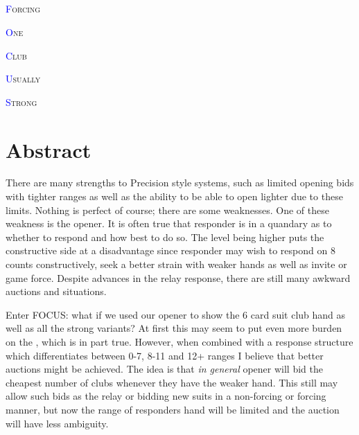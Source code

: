 \documentclass[letterpaper,11pt,oneside]{memoir}
\begin{document}
\frontmatter
\section*{}
\thispagestyle{empty}
\HUGE
\renewcommand{\LettrineFontHook}{\fontspec{BAUHS93.ttf}}

\lettrine[lraise=0.35,ante=\hspace*{2.2in}]{\textcolor{blue}{F}}{orcing}
	
\lettrine[lraise=0.35,ante=\hspace*{2.5in}]{\textcolor{blue}{O}}{ne}
	
\lettrine[lraise=0.35,ante=\hspace*{3in}]{\textcolor{blue}{C}}{lub}
	
\lettrine[lraise=0.35,ante=\hspace*{3.5in}]{\textcolor{blue}{U}}{sually}

\lettrine[lraise=0.35,ante=\hspace*{4in}]{\textcolor{blue}{S}}{trong}

\normalsize


\mainmatter
\chapter{Abstract}
There are many strengths to Precision style systems, such as limited opening bids with tighter ranges as well as the ability to be able to open lighter due to these limits. Nothing is perfect of course; there are some weaknesses. One of these weakness is the  opener.  It is often true that responder is in a quandary as to whether to respond and how best to do so. The level being higher puts the constructive side at a disadvantage since responder may wish to respond on 8 counts constructively, seek a better strain with weaker hands as well as invite or game force.  Despite advances in the  relay response, there are still many awkward auctions and situations.

Enter FOCUS:  what if we used our  opener to show the 6 card suit club hand as well as all the strong variants? At first this may seem to put even more burden on the , which is in part true. However, when combined with a response structure which differentiates between 0-7, 8-11 and 12+ ranges I believe that better auctions might be achieved. The idea is that \textit{in general} opener will bid the cheapest number of clubs whenever they have the weaker hand. This still may allow such bids as the  relay or bidding new suits in a non-forcing or forcing manner, but now the range of responders hand will be limited and the auction will have less ambiguity.
\end{document}
